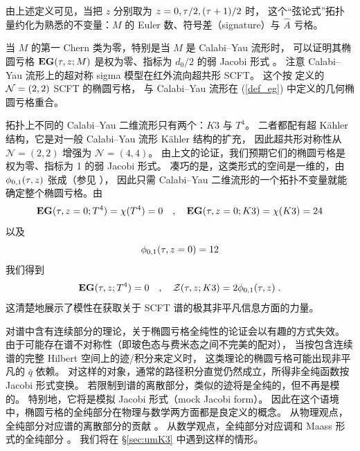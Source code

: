 
由上述定义可见，当把 $z$ 分别取为 $z=0,\tau/2,(\tau+1)/2$ 时，
这个“弦论式”拓扑量约化为熟悉的不变量：$M$ 的 Euler 数、符号差（signature）与
$\hat{A}$ 亏格。

当 $M$ 的第一 Chern 类为零，特别是当 $M$ 是 Calabi–Yau 流形时，
可以证明其椭圆亏格 ${\bf EG}(\tau,z;M)$ 是权为零、指标为 $d_0/2$ 的弱 Jacobi 形式
\cite{KawaiNucl.Phys.B414:191-2121994}。
注意 Calabi–Yau 流形上的超对称 sigma 模型在红外流向超共形 SCFT。
这个按  定义的 ${\cal N}=(2,2)$ SCFT 的椭圆亏格，
与 Calabi–Yau 流形在 (\ref{def_eg}) 中定义的几何椭圆亏格重合。

拓扑上不同的 Calabi–Yau 二维流形只有两个：$K3$ 与 $T^4$。
二者都配有超 Kähler 结构，它是对一般 Calabi–Yau 流形 Kähler 结构的扩充，
因此超共形对称性从 $\mathcal{N}=(2,2)$ 增强为 $\mathcal{N}=(4,4)$。
由上文的论证，我们预期它们的椭圆亏格是权为零、指标为 1 的弱 Jacobi 形式。
凑巧的是，这类形式的空间是一维的，由 $\phi_{0,1}(\tau,z)$ 张成（参见 ），
因此只需 Calabi–Yau 二维流形的一个拓扑不变量就能确定整个椭圆亏格。由
\[{\bf EG}(\tau,z=0;T^4) =\chi(T^4) = 0 \quad,\quad {\bf EG}(\tau,z=0;K3) =\chi(K3) = 24  
\]
以及
\[\phi_{0,1}(\tau,z=0) = 12\]
我们得到
\[
{\bf EG}(\tau,z;T^4)=0\quad,\quad {\cal Z}(\tau,z;K3) =2  \phi_{0,1}(\tau,z)\;.
\]
这清楚地展示了模性在获取关于 SCFT 谱的极其非平凡信息方面的力量。



对谱中含有连续部分的理论，关于椭圆亏格全纯性的论证会以有趣的方式失效。
由于可能存在谱不对称性（即玻色态与费米态之间不完美的配对），
当按包含连续谱的完整 Hilbert 空间上的迹/积分来定义时，
这类理论的椭圆亏格可能出现非平凡的 $\bar q$ 依赖。
对这样的对象，通常的路径积分直觉仍然成立，所得非全纯函数按 Jacobi 形式变换。
若限制到谱的离散部分，类似的迹将是全纯的，但不再是模的。
特别地，它将是模拟 Jacobi 形式（mock Jacobi form）。
因此在这个语境中，椭圆亏格的全纯部分在物理与数学两方面都是良定义的概念。
从物理观点，全纯部分对应谱的离散部分的贡献
\cite{Hanany:2002ev,Troost:2010ud,Eguchi:2010cb,Ashok:2011cy}。
从数学观点，全纯部分对应调和 Maass 形式的全纯部分 \cite{MR2097357}。
我们将在 \S\ref{sec:umK3} 中遇到这样的情形。


